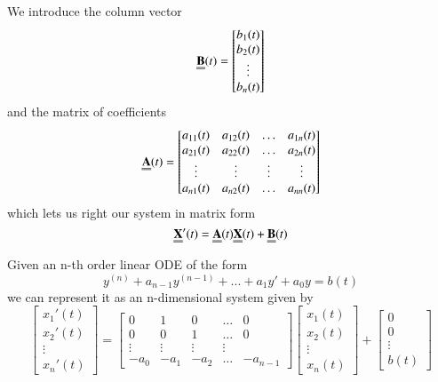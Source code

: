 

\begin{remark}[Notation]
        We introduce the column vector \begin{equation}
                \Emph{B}(t) = \begin{bmatrix}b_1(t) \\ b_2(t) \\ \vdots \\ b_n(t) \end{bmatrix}
        \end{equation}
        and the matrix of coefficients \begin{equation}
                \Emph{A}(t) = \begin{bmatrix}a_{11}(t) & a_{12}(t) & \hdots & a_{1n}(t) \\ a_{21}(t) & a_{22}(t) & \hdots & a_{2n}(t)\\ \vdots & \vdots & \vdots & \vdots \\ a_{n1}(t) & a_{n2}(t) & \hdots & a_{nn}(t) \end{bmatrix}
        \end{equation}
        which lets us right our system in matrix form \begin{equation}
                \Emph{X}'(t) = \Emph{A}(t)\Emph{X}(t)+\Emph{B}(t)
        \end{equation}
\end{remark}




\begin{remark}
        Given an n-th order linear ODE of the form $$y^{(n)}+a_{n-1}y^{(n-1)}+...+a_1y'+a_0y=b(t)$$ we can represent it as an n-dimensional system given by \begin{equation}
                \begin{bmatrix}x_1'(t) \\ x_2'(t) \\ \vdots \\ x_n'(t) \end{bmatrix} = \begin{bmatrix} 0 & 1 & 0 & \hdots & 0 \\ 0 & 0 & 1 & \hdots & 0 \\ \vdots & \vdots & \vdots & \vdots \\ -a_0 & -a_1 & -a_2 & \hdots & -a_{n-1} \end{bmatrix}\begin{bmatrix}x_1(t) \\ x_2(t) \\ \vdots \\ x_n(t) \end{bmatrix}+\begin{bmatrix}0 \\ 0 \\ \vdots \\ b(t) \end{bmatrix}
        \end{equation}
\end{remark}


